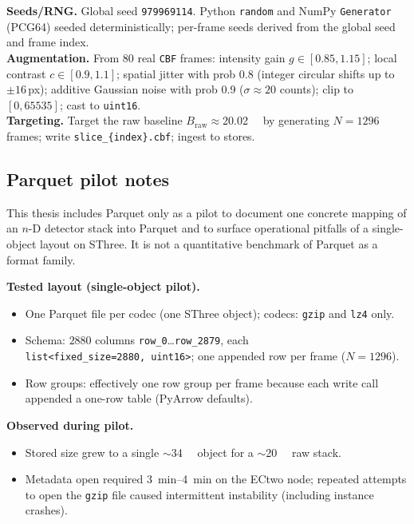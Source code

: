 \documentclass[nomenclature, english, bibtex]{kththesis}
\numberwithin{listing}{chapter}
\begin{document}
\textbf{Seeds/RNG.} Global seed \texttt{979969114}. Python \texttt{random} and NumPy \texttt{Generator} (PCG64) seeded deterministically; per-frame seeds derived from the global seed and frame index.\\
\textbf{Augmentation.} From 80 real \texttt{CBF} frames: intensity gain $g\in[0.85,1.15]$; local contrast $c\in[0.9,1.1]$; spatial jitter with prob 0.8 (integer circular shifts up to $\pm16$\,px); additive Gaussian noise with prob 0.9 ($\sigma\approx20$ counts); clip to $[0,65535]$; cast to \texttt{uint16}.\\
\textbf{Targeting.} Target the raw baseline \(B_{\text{raw}}\approx\)\SI{20.02}{\gibi\byte} by generating \(N{=}1296\) frames; write \texttt{slice\_\{index\}.cbf}; ingest to stores.

\subsection{Parquet pilot notes}
\label{app:a8-parquet}
This thesis includes Parquet only as a pilot to document one concrete mapping of an $n$-D detector stack into Parquet and to surface operational pitfalls of a single-object layout on \gls{SThree}. It is not a quantitative benchmark of Parquet as a format family.

\textbf{Tested layout (single-object pilot).}
\begin{itemize}
  \item One Parquet file per codec (one \gls{SThree} object); codecs: \texttt{gzip} and \texttt{lz4} only.
  \item Schema: $2880$ columns \texttt{row\_0}\dots\texttt{row\_2879}, each \\ \texttt{list<fixed\_size=2880, uint16>}; one appended row per frame (\(N{=}1296\)).
  \item Row groups: effectively one row group per frame because each write call appended a one-row table (PyArrow defaults).
\end{itemize}

\textbf{Observed during pilot.}
\begin{itemize}
  \item Stored size grew to a single \(\sim\)\SI{34}{\gibi\byte} object for a \(\sim\)\SI{20}{\gibi\byte} raw stack.
  \item Metadata open required \SIrange{3}{4}{\minute} on the \gls{ECtwo} node; repeated attempts to open the \texttt{gzip} file caused intermittent instability (including instance crashes).
\end{itemize}
\end{document}
